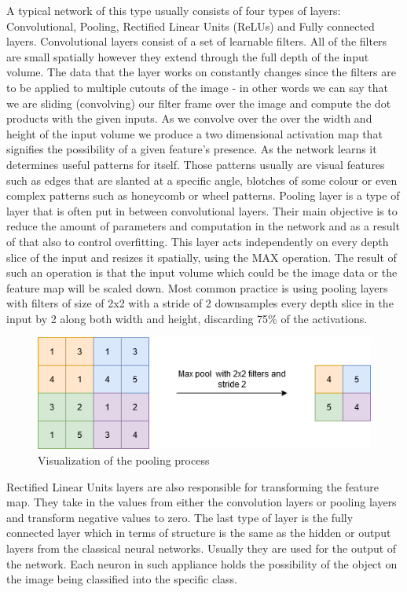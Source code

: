 \documentclass{ijisa}
\begin{document}
A typical network of this type usually consists of four types of layers: Convolutional, Pooling, Rectified Linear Units (ReLUs) and Fully connected layers. Convolutional layers consist of a set of learnable filters. All of the filters are small spatially however they extend through the full depth of the input volume. The data that the layer works on constantly changes since the filters are to be applied to multiple cutouts of the image - in other words we can say that we are sliding (convolving) our filter frame over the image and compute the dot products with the given inputs. As we convolve over the over the width and height of the input volume we produce a two dimensional activation map that signifies the possibility of a given feature's presence. As the network learns it determines useful patterns for itself. Those patterns usually are visual features such as edges that are slanted at a specific angle, blotches of some colour or even complex patterns such as honeycomb or wheel patterns. Pooling layer is a type of layer that is often put in between convolutional layers. Their main objective is to reduce the amount of parameters and computation in the network and as a result of that also to control overfitting. This layer acts independently on every depth slice of the input and resizes it spatially, using the MAX operation. The result of such an operation is that the input volume which could be the image data or the feature map will be scaled down. Most common practice is using pooling layers with filters of size of 2x2 with a stride of 2 downsamples every depth slice in the input by 2 along both width and height, discarding 75\% of the activations.

\begin{figure}[!h]
\centering
\includegraphics[width=.8\columnwidth]{Images/pooling.png}
\caption{Visualization of the pooling process} \label{fig:fig3}
\end{figure}

Rectified Linear Units layers are also responsible for transforming the feature map. They take in the values from either the convolution layers or pooling layers and transform negative values to zero. The last type of layer is the fully connected layer which in terms of structure is the same as the hidden or output layers from the classical neural networks. Usually they are used for the output of the network. Each neuron in such appliance holds the possibility of the object on the image being classified into the specific class.
\end{document}
